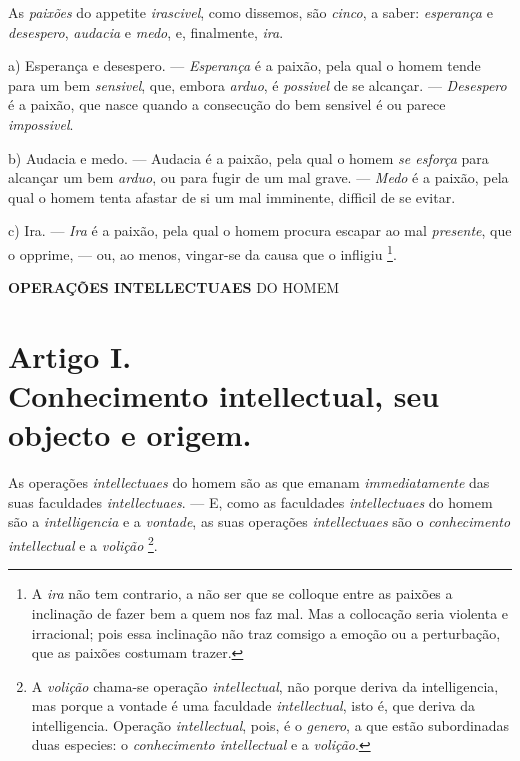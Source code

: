 
 
As \emph{paixões} do appetite \emph{irascivel}, como dissemos, são \emph{cinco}, a saber: \emph{esperança} e \emph{desespero}, \emph{audacia} e \emph{medo}, e, finalmente, \emph{ira}.

a) Esperança e desespero. --- \emph{Esperança} é a paixão, pela qual o homem tende para um bem \emph{sensivel}, que, embora \emph{arduo}, é \emph{possivel} de se alcançar. --- \emph{Desespero} é a paixão, que nasce quando a consecução do bem sensivel é ou parece \emph{impossivel}.

b) Audacia e medo. --- Audacia é a paixão, pela qual o homem \emph{se esforça} para alcançar um bem \emph{arduo}, ou para fugir de um mal grave. --- \emph{Medo} é a paixão, pela qual o homem tenta afastar de si um mal imminente, difficil de se evitar.

c) Ira. --- \emph{Ira} é a paixão, pela qual o homem procura escapar ao mal \emph{presente}, que o opprime, --- ou, ao menos, vingar-se da causa que o infligiu \footnote{A \emph{ira} não tem contrario, a não ser que se colloque entre as paixões a inclinação de fazer bem a quem nos faz mal. Mas a collocação seria violenta e irracional; pois essa inclinação não traz comsigo a emoção ou a perturbação, que as paixões costumam trazer.}.

\textbf{OPERAÇÕES INTELLECTUAES} DO HOMEM


\section*{Artigo I.\\ Conhecimento intellectual, seu objecto e origem.}


  
As operações \emph{intellectuaes} do homem são as que emanam \emph{immediatamente} das suas faculdades \emph{intellectuaes}. --- E, como as faculdades \emph{intellectuaes} do homem são a \emph{intelligencia} e a \emph{vontade}, as suas operações \emph{intellectuaes} são o \emph{conhecimento intellectual} e a \emph{volição} \footnote{A \emph{volição} chama-se operação \emph{intellectual}, não porque deriva da intelligencia, mas porque a vontade é uma faculdade \emph{intellectual}, isto é, que deriva da intelligencia. Operação \emph{intellectual}, pois, é o \emph{genero}, a que estão subordinadas duas especies: o \emph{conhecimento intellectual} e a \emph{volição}.}.

